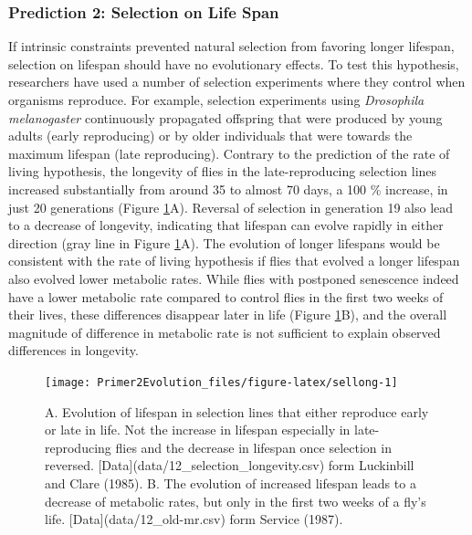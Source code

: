 \documentclass[
]{book}
\begin{document}
\hypertarget{prediction-2-selection-on-life-span}{%
\subsubsection*{Prediction 2: Selection on Life Span}\label{prediction-2-selection-on-life-span}}

If intrinsic constraints prevented natural selection from favoring longer lifespan, selection on lifespan should have no evolutionary effects. To test this hypothesis, researchers have used a number of selection experiments where they control when organisms reproduce. For example, selection experiments using \emph{Drosophila melanogaster} continuously propagated offspring that were produced by young adults (early reproducing) or by older individuals that were towards the maximum lifespan (late reproducing). Contrary to the prediction of the rate of living hypothesis, the longevity of flies in the late-reproducing selection lines increased substantially from around 35 to almost 70 days, a 100 \% increase, in just 20 generations (Figure \ref{fig:sellong}A). Reversal of selection in generation 19 also lead to a decrease of longevity, indicating that lifespan can evolve rapidly in either direction (gray line in Figure \ref{fig:sellong}A). The evolution of longer lifespans would be consistent with the rate of living hypothesis if flies that evolved a longer lifespan also evolved lower metabolic rates. While flies with postponed senescence indeed have a lower metabolic rate compared to control flies in the first two weeks of their lives, these differences disappear later in life (Figure \ref{fig:sellong}B), and the overall magnitude of difference in metabolic rate is not sufficient to explain observed differences in longevity.

\begin{figure}
\texttt{[image: Primer2Evolution\_files/figure-latex/sellong-1]} \caption{A. Evolution of lifespan in selection lines that either reproduce early or late in life. Not the increase in lifespan especially in late-reproducing flies and the decrease in lifespan once selection in reversed. [Data](data/12_selection_longevity.csv) form Luckinbill and Clare (1985). B. The evolution of increased lifespan leads to a decrease of metabolic rates, but only in the first two weeks of a fly's life. [Data](data/12_old-mr.csv) form Service (1987).}\label{fig:sellong}
\end{figure}
\end{document}
